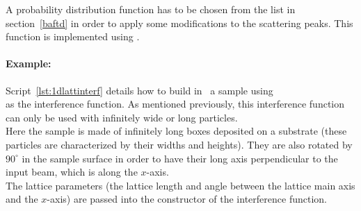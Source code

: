 
\vspace{12pt}
A probability distribution function  has to be chosen from the list in section~\ref{baftd} in order to apply some modifications to the scattering peaks. This function is implemented using . 

\paragraph{Example:} Script~\ref{lst:1dlattinterf} details how to build in  \BornAgain\ a sample using\\  as the interference function. As mentioned previously, this interference function can only be used with infinitely wide or long particles.\\ Here the sample is made of infinitely long boxes deposited on a substrate (these particles are characterized by their widths and heights). They are also rotated by $90^{\circ}$  in the sample surface in order to have their long axis perpendicular to the input beam, which is along the $x$-axis.\\
 The lattice parameters (the lattice length and angle between the lattice main axis and the $x$-axis) are passed into the constructor of the interference function.

